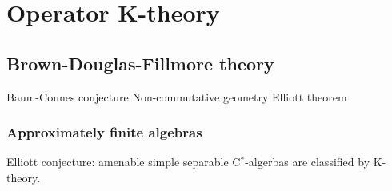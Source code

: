 \documentclass{../../large}
\begin{document}
\part{Operator K-theory}
\chapter{Brown-Douglas-Fillmore theory}
\begin{prb}
\end{prb}

Baum-Connes conjecture
Non-commutative geometry
Elliott theorem




\section{Approximately finite algebras}
Elliott conjecture: amenable simple separable C$^*$-algerbas are classified by K-theory.
\end{document}
